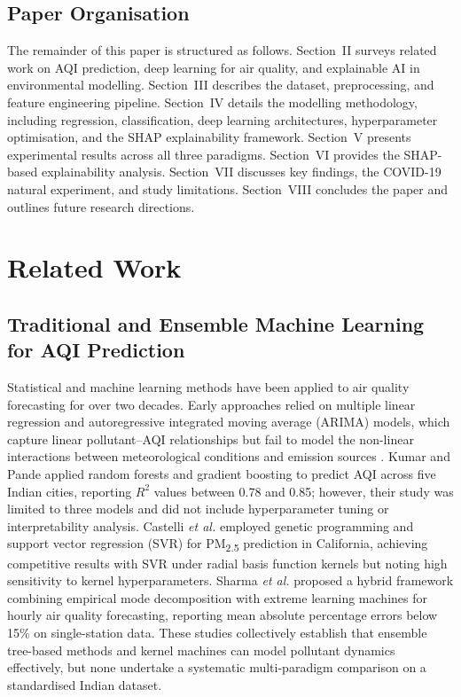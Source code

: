 \documentclass[conference]{IEEEtran}
\begin{document}
\subsection{Paper Organisation}

The remainder of this paper is structured as follows. Section~II surveys related work on AQI prediction, deep learning for air quality, and explainable AI in environmental modelling. Section~III describes the dataset, preprocessing, and feature engineering pipeline. Section~IV details the modelling methodology, including regression, classification, deep learning architectures, hyperparameter optimisation, and the SHAP explainability framework. Section~V presents experimental results across all three paradigms. Section~VI provides the SHAP-based explainability analysis. Section~VII discusses key findings, the COVID-19 natural experiment, and study limitations. Section~VIII concludes the paper and outlines future research directions.

\section{Related Work}

\subsection{Traditional and Ensemble Machine Learning for AQI Prediction}

Statistical and machine learning methods have been applied to air quality forecasting for over two decades. Early approaches relied on multiple linear regression and autoregressive integrated moving average (ARIMA) models, which capture linear pollutant--AQI relationships but fail to model the non-linear interactions between meteorological conditions and emission sources \cite{hastie2009}. Kumar and Pande \cite{kumar2022} applied random forests and gradient boosting to predict AQI across five Indian cities, reporting $R^2$ values between 0.78 and 0.85; however, their study was limited to three models and did not include hyperparameter tuning or interpretability analysis. Castelli \textit{et al.} \cite{castelli2020} employed genetic programming and support vector regression (SVR) for PM\textsubscript{2.5} prediction in California, achieving competitive results with SVR under radial basis function kernels but noting high sensitivity to kernel hyperparameters. Sharma \textit{et al.} \cite{sharma2020} proposed a hybrid framework combining empirical mode decomposition with extreme learning machines for hourly air quality forecasting, reporting mean absolute percentage errors below 15\% on single-station data. These studies collectively establish that ensemble tree-based methods and kernel machines can model pollutant dynamics effectively, but none undertake a systematic multi-paradigm comparison on a standardised Indian dataset.
\end{document}
